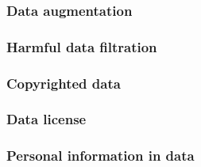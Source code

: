 \documentclass{article}
\begin{document}
\subsubsection{Data augmentation}


\subsubsection{Harmful data filtration}

\subsubsection{Copyrighted data}


\subsubsection{Data license}


\subsubsection{Personal information in data}
\end{document}
